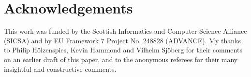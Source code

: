 \documentclass{jfp1}
\newcounter{per}
\begin{document}




%





%

%



\section*{Acknowledgements}

This work was funded by the Scottish Informatics and Computer Science Alliance
(SICSA) and by EU Framework 7 Project No. 248828 (ADVANCE).  My thanks to
Philip H\"{o}lzenspies, Kevin Hammond and Vilhelm Sj\"{o}berg for their
comments on an earlier draft of this paper, and to the anonymous referees for
their many insightful and constructive comments.




\appendix





%
\end{document}
